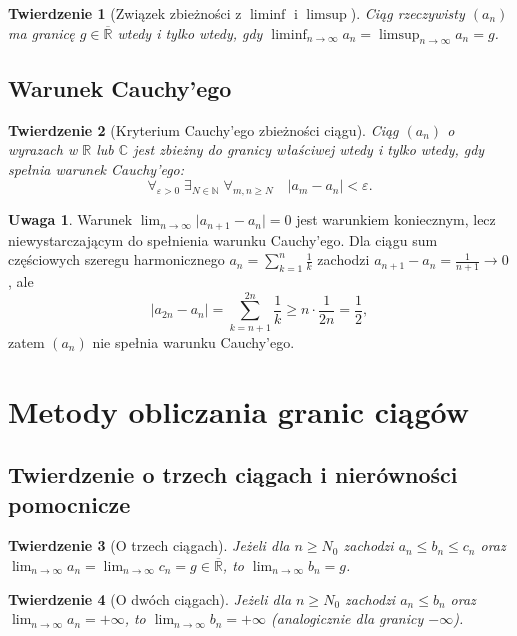 \documentclass[11pt, a4paper]{article}
\theoremstyle{plain}
\newtheorem*{twierdzenie}{Twierdzenie}
\theoremstyle{definition}
\newtheorem*{uwaga}{Uwaga}
\begin{document}
\begin{twierdzenie}[Związek zbieżności z $\liminf$ i $\limsup$]
Ciąg rzeczywisty $(a_n)$ ma granicę $g \in \overline{\mathbb{R}}$ wtedy i tylko wtedy, gdy $\liminf_{n\to\infty} a_n = \limsup_{n\to\infty} a_n = g$.
\end{twierdzenie}

\subsection{Warunek Cauchy'ego}

\begin{twierdzenie}[Kryterium Cauchy'ego zbieżności ciągu]
Ciąg $(a_n)$ o wyrazach w $\mathbb{R}$ lub $\mathbb{C}$ jest zbieżny do granicy właściwej wtedy i tylko wtedy, gdy spełnia warunek Cauchy'ego:
\[
\forall_{\varepsilon > 0} \; \exists_{N \in \mathbb{N}} \; \forall_{m, n \geqslant N} \quad \lvert a_m - a_n \rvert < \varepsilon.
\]
\end{twierdzenie}

\begin{uwaga}
Warunek $\lim_{n\to\infty} \lvert a_{n+1} - a_n \rvert = 0$ jest warunkiem koniecznym, lecz niewystarczającym do spełnienia warunku Cauchy'ego. Dla ciągu sum częściowych szeregu harmonicznego $a_n = \sum_{k=1}^n \frac{1}{k}$ zachodzi $a_{n+1} - a_n = \frac{1}{n+1} \to 0$, ale
\[
\lvert a_{2n} - a_n \rvert = \sum_{k=n+1}^{2n} \frac{1}{k} \geqslant n \cdot \frac{1}{2n} = \frac{1}{2},
\]
zatem $(a_n)$ nie spełnia warunku Cauchy'ego.
\end{uwaga}

\section{Metody obliczania granic ciągów}

\subsection{Twierdzenie o trzech ciągach i nierówności pomocnicze}

\begin{twierdzenie}[O trzech ciągach]
Jeżeli dla $n \geqslant N_0$ zachodzi $a_n \leqslant b_n \leqslant c_n$ oraz $\lim_{n\to\infty} a_n = \lim_{n\to\infty} c_n = g \in \overline{\mathbb{R}}$, to $\lim_{n\to\infty} b_n = g$.
\end{twierdzenie}

\begin{twierdzenie}[O dwóch ciągach]
Jeżeli dla $n \geqslant N_0$ zachodzi $a_n \leqslant b_n$ oraz $\lim_{n\to\infty} a_n = +\infty$, to $\lim_{n\to\infty} b_n = +\infty$ (analogicznie dla granicy $-\infty$).
\end{twierdzenie}
\end{document}
